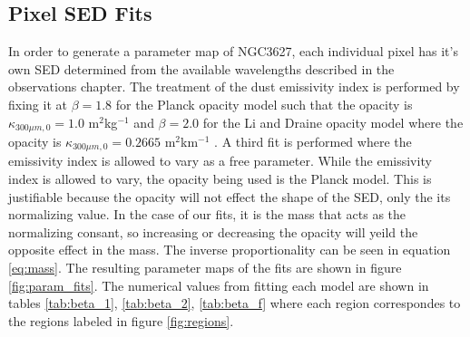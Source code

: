 \subsection{Pixel SED Fits}

In order to generate a parameter map of NGC3627, each individual pixel has it's own SED determined from the available wavelengths described in the observations chapter.  The treatment of the dust emissivity index is performed by fixing it at $\beta=1.8$ for the Planck opacity model such that the opacity is $\kappa_{300\mu m,0}=1.0$ m$^2$kg$^{-1}$ \citep{planck252011} and $\beta=2.0$ for the Li and Draine opacity model where the opacity is $\kappa_{300\mu m,0}=0.2665$ m$^2$km$^{-1}$ \citep{li2001}.  A third fit is performed where the emissivity index is allowed to vary as a free parameter.  While the emissivity index is allowed to vary, the opacity being used is the Planck model.  This is justifiable because the opacity will not effect the shape of the SED, only the its normalizing value.  In the case of our fits, it is the mass that acts as the normalizing consant, so increasing or decreasing the opacity will yeild the opposite effect in the mass.  The inverse proportionality can be seen in equation \ref{eq:mass}.  The resulting parameter maps of the fits are shown in figure \ref{fig:param_fits}. The numerical values from fitting each model are shown in tables \ref{tab:beta_1}, \ref{tab:beta_2}, \ref{tab:beta_f} where each region correspondes to the regions labeled in figure \ref{fig:regions}.

